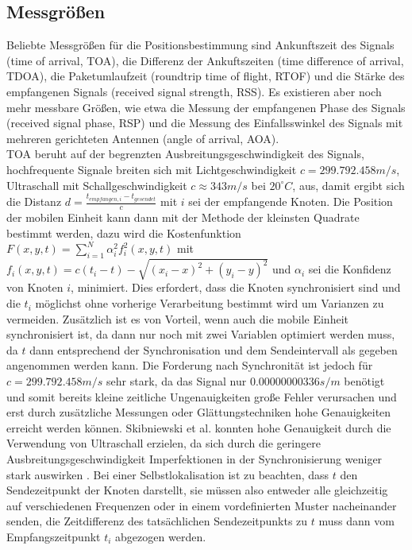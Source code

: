 \subsection{Messgrößen}
Beliebte Messgrößen für die Positionsbestimmung sind Ankunftszeit des Signals (time of arrival, TOA), die Differenz der Ankuftszeiten (time difference of arrival, TDOA), die Paketumlaufzeit (roundtrip time of flight, RTOF) und die Stärke des empfangenen Signals (received signal strength, RSS). Es existieren aber noch mehr messbare Größen, wie etwa die Messung der empfangenen Phase des Signals (received signal phase, RSP) und die Messung des Einfallsswinkel des Signals mit mehreren gerichteten Antennen (angle of arrival, AOA). \\
TOA beruht auf der begrenzten Ausbreitungsgeschwindigkeit des Signals, hochfrequente Signale breiten sich mit Lichtgeschwindigkeit $c = 299.792.458m/s$, Ultraschall mit Schallgeschwindigkeit $c \approx 343m/s$ bei $20^{\circ}C$, aus, damit ergibt sich die Distanz $d = \frac{t_{empfangen,i} - t_{gesendet}}{c}$ mit $i$ sei der empfangende Knoten. Die Position der mobilen Einheit kann dann mit der Methode der kleinsten Quadrate bestimmt werden, dazu wird die Kostenfunktion $F(x,y,t) = \sum_{i=1}^{N} {\alpha}^2_i f^2_i(x,y,t)$ mit $f_i(x,y,t) = c(t_i - t) - \sqrt{(x_i - x)^2 + (y_i - y)^2}$ und ${\alpha}_i$ sei die Konfidenz von Knoten $i$, minimiert. Dies erfordert, dass die Knoten synchronisiert sind und die $t_i$ möglichst ohne vorherige Verarbeitung bestimmt wird um Varianzen zu vermeiden. Zusätzlich ist es von Vorteil, wenn auch die mobile Einheit synchronisiert ist, da dann nur noch mit zwei Variablen optimiert werden muss, da $t$ dann entsprechend der Synchronisation und dem Sendeintervall als gegeben angenommen werden kann. Die Forderung nach Synchronität ist jedoch für $c = 299.792.458m/s$ sehr stark, da das Signal nur $0.00000000336 s/m$ benötigt und somit bereits kleine zeitliche Ungenauigkeiten große Fehler verursachen und erst durch zusätzliche Messungen oder Glättungstechniken hohe Genauigkeiten erreicht werden können. Skibniewski et al. konnten hohe Genauigkeit durch die Verwendung von Ultraschall erzielen, da sich durch die geringere Ausbreitungsgeschwindigkeit Imperfektionen in der Synchronisierung weniger stark auswirken \cite{skibniewski2009simulation}. 
Bei einer Selbstlokalisation ist zu beachten, dass $t$ den Sendezeitpunkt der Knoten darstellt, sie müssen also entweder alle gleichzeitig auf verschiedenen Frequenzen oder in einem vordefinierten Muster nacheinander senden, die Zeitdifferenz des tatsächlichen Sendezeitpunkts zu $t$ muss dann vom Empfangszeitpunkt $t_i$ abgezogen werden. \\
